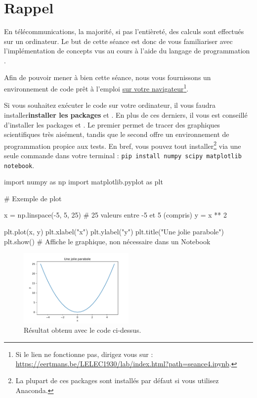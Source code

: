 \documentclass [a4paper, 11pt] {article}
\begin{document}
    \makeseancetitle
    \thispagestyle{firstpage}
    
    \part*{Rappel}
    
    En télécommunications, la majorité, si pas l'entièreté, des calculs sont effectués sur un ordinateur. Le but de cette séance est donc de vous familiariser avec l'implémentation de concepts vus au cours à l'aide du langage de programmation .
    
    Afin de pouvoir mener à bien cette séance, nous vous fournissons un environnement de code prêt à l'emploi \href{https://eertmans.be/LELEC1930/lab/index.html?path=seance4.ipynb}{sur votre navigateur}\footnote{Si le lien ne fonctionne pas, dirigez vous sur : \url{https://eertmans.be/LELEC1930/lab/index.html?path=seance4.ipynb}.}.
    
    Si vous souhaitez exécuter le code sur votre ordinateur, il vous faudra installer\textbf{installer les packages}  et . En plus de ces derniers, il vous est conseillé d'installer les packages  et . Le premier permet de tracer des graphiques scientifiques très aisément, tandis que le second offre un environnement de programmation propice aux tests. En bref, vous pouvez tout installer\footnote{La plupart de ces packages sont installés par défaut si vous utilisez Anaconda.} via une seule commande dans votre terminal : \texttt{pip install numpy scipy matplotlib notebook}.
    
    \begin{python}
import numpy as np
import matplotlib.pyplot as plt

# Exemple de plot

x = np.linspace(-5, 5, 25)  # 25 valeurs entre -5 et 5 (compris)
y = x ** 2

plt.plot(x, y)
plt.xlabel("x")
plt.ylabel("y")
plt.title("Une jolie parabole")
plt.show()  # Affiche le graphique, non nécessaire dans un Notebook
    \end{python}
    
    \begin{figure}[H]
        \centering
        \includegraphics[width=0.5\textwidth]{imgs/parabole.pdf}
        \caption{Résultat obtenu avec le code ci-dessus.}
        \label{fig:parabole}
    \end{figure}
    
\end{document}
